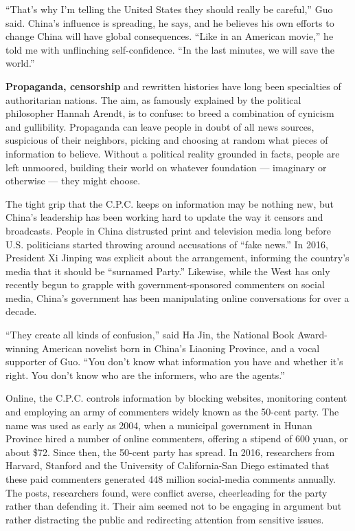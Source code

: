 ``That's why I'm telling the United States they should really be
careful,'' Guo said. China's influence is spreading, he says, and he
believes his own efforts to change China will have global consequences.
``Like in an American movie,'' he told me with unflinching
self-confidence. ``In the last minutes, we will save the world.''

\textbf{Propaganda, censorship} and rewritten histories have long been
specialties of authoritarian nations. The aim, as famously explained by
the political philosopher Hannah Arendt, is to confuse: to breed a
combination of cynicism and gullibility. Propaganda can leave people in
doubt of all news sources, suspicious of their neighbors, picking and
choosing at random what pieces of information to believe. Without a
political reality grounded in facts, people are left unmoored, building
their world on whatever foundation --- imaginary or otherwise --- they
might choose.

The tight grip that the C.P.C. keeps on information may be nothing new,
but China's leadership has been working hard to update the way it
censors and broadcasts. People in China distrusted print and television
media long before U.S. politicians started throwing around accusations
of ``fake news.'' In 2016, President Xi Jinping was explicit about the
arrangement, informing the country's media that it should be ``surnamed
Party.'' Likewise, while the West has only recently begun to grapple
with government-sponsored commenters on social media, China's government
has been manipulating online conversations for over a decade.

``They create all kinds of confusion,'' said Ha Jin, the National Book
Award-winning American novelist born in China's Liaoning Province, and a
vocal supporter of Guo. ``You don't know what information you have and
whether it's right. You don't know who are the informers, who are the
agents.''

Online, the C.P.C. controls information by blocking websites, monitoring
content and employing an army of commenters widely known as the 50-cent
party. The name was used as early as 2004, when a municipal government
in Hunan Province hired a number of online commenters, offering a
stipend of 600 yuan, or about \$72. Since then, the 50-cent party has
spread. In 2016, researchers from Harvard, Stanford and the University
of California-San Diego estimated that these paid commenters generated
448 million social-media comments annually. The posts, researchers
found, were conflict averse, cheerleading for the party rather than
defending it. Their aim seemed not to be engaging in argument but rather
distracting the public and redirecting attention from sensitive issues.

